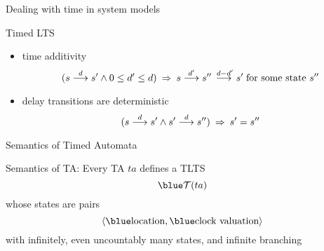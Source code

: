 \documentclass{beamer}
\def\dkb#1{{\blue #1}}
\def\TL#1{\mathcal{T}(#1)}
\begin{document}
\begin{slide}{Dealing with time in system models}
\small
\begin{block}{Timed LTS}
\begin{itemize}
\item \dkb{time additivity}
\begin{equation*}
(s \stackrel{d}{\longrightarrow} s'  \mathbin{\wedge} 0 \leq d' \leq d)\; \mathbin{\Rightarrow}\; s  \stackrel{d'}{\longrightarrow} s'' \stackrel{\; d-d'}{\longrightarrow} s' \; \text{for some state $s''$}
\end{equation*}
\item delay transitions are \dkb{deterministic}
\begin{equation*}
(s \stackrel{d}{\longrightarrow} s'  \mathbin{\wedge} s' \stackrel{d}{\longrightarrow} s'')\; \mathbin{\Rightarrow}\; s'  = s''
\end{equation*}
\end{itemize}
\end{block}
\end{slide}







\begin{slide}{Semantics of Timed Automata}
\small

\begin{block}{Semantics of TA:}
Every TA $ta$ defines a TLTS 
\begin{equation*}
\dkb{\TL{ta}}
\end{equation*}
whose states are pairs 
\begin{equation*}
\pair{\dkb{\text{location}}, \dkb{\text{clock valuation}} }
\end{equation*}
with \dkb{infinitely}, even \dkb{uncountably} many states, and infinite branching
\end{block}
\end{slide}
\end{document}
